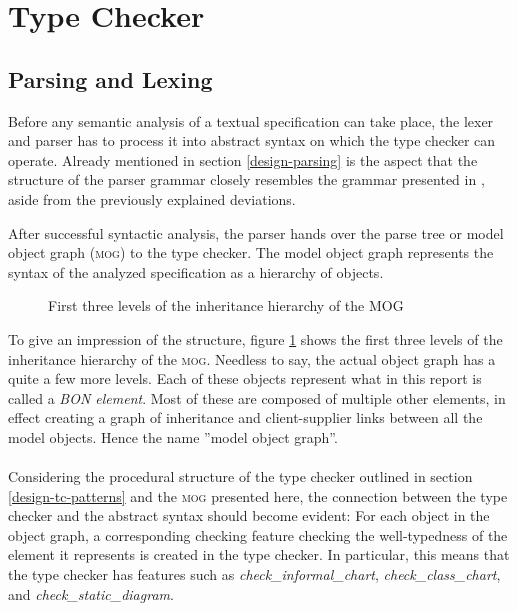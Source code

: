 \section{Type Checker}
\subsection{Parsing and Lexing}
\label{implementation-parser}
Before any semantic analysis of a textual \bon{} specification can take place, the lexer and parser has to process it into abstract syntax on which the type checker can operate. Already mentioned in section \ref{design-parsing} is the aspect that the structure of the parser grammar closely resembles the grammar presented in \cite[pp.~352-359]{walden1995}, aside from the previously explained deviations.

After successful syntactic analysis, the parser hands over the parse tree or model object graph (\textsc{mog}) to the type checker. The model object graph represents the syntax of the analyzed specification as a hierarchy of objects.
\begin{figure}[H]
    \centerline{}
    \caption[MOG hierarchy]{First three levels of the inheritance hierarchy of the MOG}
    \label{fig:mog-hierarchy}
\end{figure}
To give an impression of the structure, figure \ref{fig:mog-hierarchy} shows the first three levels of the inheritance hierarchy of the \textsc{mog}. Needless to say, the actual object graph has a quite a few more levels. Each of these objects represent what in this report is called a \textit{BON element}. Most of these are composed of multiple other \bon{} elements, in effect creating a graph of inheritance and client-supplier links between all the model objects. Hence the name ''model object graph''.
\paragraph{}
Considering the procedural structure of the type checker outlined in section \ref{design-tc-patterns} and the \textsc{mog} presented here, the connection between the type checker and the abstract syntax should become evident: For each object in the object graph, a corresponding checking feature checking the well-typedness of the \bon{} element it represents is created in the type checker. In particular, this means that the type checker has features such as \textit{check\_informal\_chart}, \textit{check\_class\_chart}, and \textit{check\_static\_diagram}.

